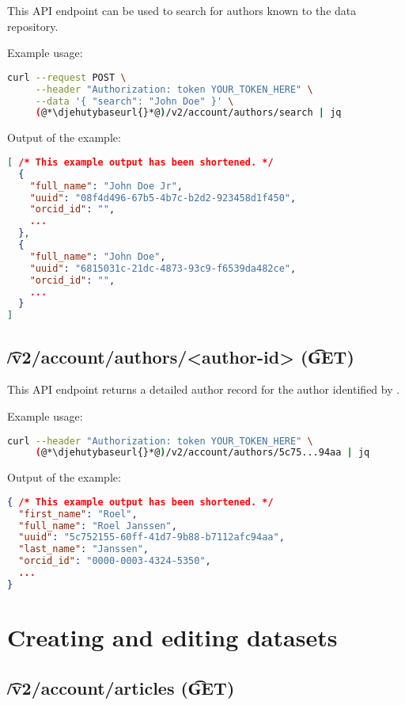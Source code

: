   This API endpoint can be used to search for authors known to the data
  repository.

  Example usage:
\begin{lstlisting}[language=bash]
curl --request POST \
     --header "Authorization: token YOUR_TOKEN_HERE" \
     --data '{ "search": "John Doe" }' \
     (@*\djehutybaseurl{}*@)/v2/account/authors/search | jq
\end{lstlisting}

  Output of the example:
\begin{lstlisting}[language=JSON]
[ /* This example output has been shortened. */
  {
    "full_name": "John Doe Jr",
    "uuid": "08f4d496-67b5-4b7c-b2d2-923458d1f450",
    "orcid_id": "",
    ...
  },
  {
    "full_name": "John Doe",
    "uuid": "6815031c-21dc-4873-93c9-f6539da482ce",
    "orcid_id": "",
    ...
  }
]
\end{lstlisting}

\subsection{\t{/v2/account/authors/<author-id>} (\t{GET})}

  This API endpoint returns a detailed author record for the author identified
  by \code{author-id}.

  Example usage:
\begin{lstlisting}[language=bash]
curl --header "Authorization: token YOUR_TOKEN_HERE" \
     (@*\djehutybaseurl{}*@)/v2/account/authors/5c75...94aa | jq
\end{lstlisting}

  Output of the example:
\begin{lstlisting}[language=JSON]
{ /* This example output has been shortened. */
  "first_name": "Roel",
  "full_name": "Roel Janssen",
  "uuid": "5c752155-60ff-41d7-9b88-b7112afc94aa",
  "last_name": "Janssen",
  "orcid_id": "0000-0003-4324-5350",
  ...
}
\end{lstlisting}

\section{Creating and editing datasets}

\subsection{\t{/v2/account/articles} (\t{GET})}


